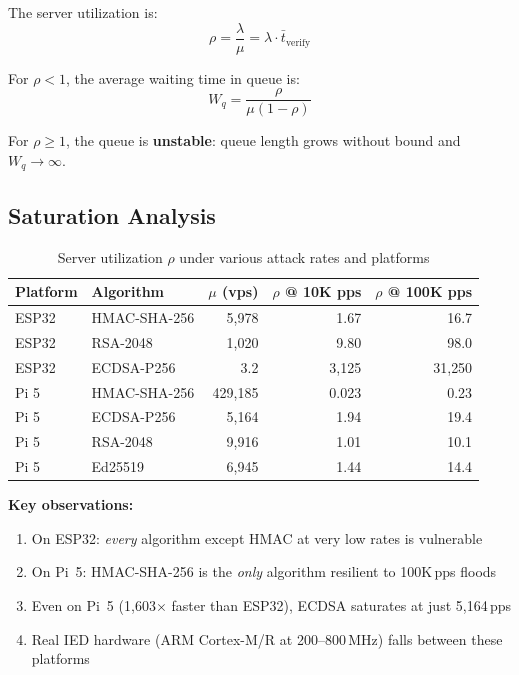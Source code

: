 \documentclass[11pt,a4paper]{article}
\begin{document}
The server utilization is:
\begin{equation}
\rho = \frac{\lambda}{\mu} = \lambda \cdot \bar{t}_{\text{verify}}
\end{equation}

For $\rho < 1$, the average waiting time in queue is:
\begin{equation}
W_q = \frac{\rho}{\mu(1 - \rho)}
\end{equation}

For $\rho \geq 1$, the queue is \textbf{unstable}: queue length grows without bound and $W_q \to \infty$.

\subsection{Saturation Analysis}

\begin{table}[H]
\centering
\caption{Server utilization $\rho$ under various attack rates and platforms}
\label{tab:rho}
\begin{tabular}{@{}llrrr@{}}
\toprule
\textbf{Platform} & \textbf{Algorithm} & $\mu$ \textbf{(vps)} & $\rho$ \textbf{@ 10K pps} & $\rho$ \textbf{@ 100K pps} \\
\midrule
ESP32 & HMAC-SHA-256 & 5{,}978 & 1.67 & 16.7 \\
ESP32 & RSA-2048 & 1{,}020 & 9.80 & 98.0 \\
ESP32 & ECDSA-P256 & 3.2 & 3{,}125 & 31{,}250 \\
\midrule
Pi 5 & HMAC-SHA-256 & 429{,}185 & 0.023 & 0.23 \\
Pi 5 & ECDSA-P256 & 5{,}164 & 1.94 & 19.4 \\
Pi 5 & RSA-2048 & 9{,}916 & 1.01 & 10.1 \\
Pi 5 & Ed25519 & 6{,}945 & 1.44 & 14.4 \\
\bottomrule
\end{tabular}
\end{table}

\textbf{Key observations:}
\begin{enumerate}[leftmargin=2em]
    \item On ESP32: \emph{every} algorithm except HMAC at very low rates is vulnerable
    \item On Pi~5: HMAC-SHA-256 is the \emph{only} algorithm resilient to 100K\,pps floods
    \item Even on Pi~5 (1{,}603$\times$ faster than ESP32), ECDSA saturates at just 5{,}164\,pps
    \item Real IED hardware (ARM Cortex-M/R at 200--800\,MHz) falls between these platforms
\end{enumerate}
\end{document}
